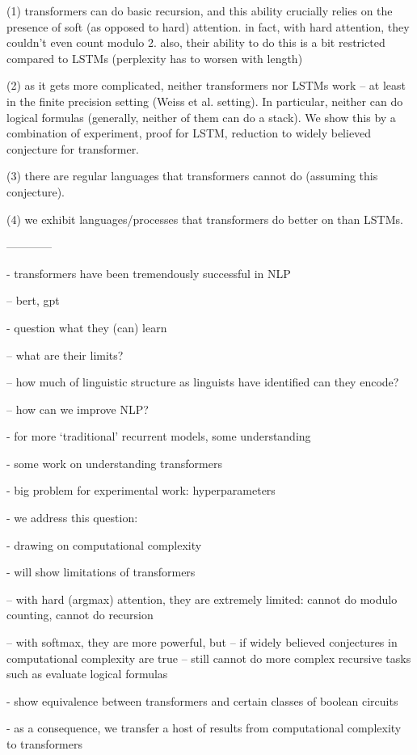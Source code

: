 \documentclass[11pt,a4paper]{article}
\begin{document}
(1) transformers can do basic recursion, and this ability crucially relies on the presence of soft (as opposed to hard) attention. in fact, with hard attention, they couldn't even count modulo 2. also, their ability to do this is a bit restricted compared to LSTMs (perplexity has to worsen with length)

(2) as it gets more complicated, neither transformers nor LSTMs work -- at least in the finite precision setting (Weiss et al. setting).
In particular, neither can do logical formulas (generally, neither of them can do a stack).
We show this by a combination of experiment, proof for LSTM, reduction to widely believed conjecture for transformer.

(3) there are regular languages that transformers cannot do (assuming this conjecture).

(4) we exhibit languages/processes that transformers do better on than LSTMs.



------------

- transformers have been tremendously successful in NLP

-- bert, gpt

- question what they (can) learn 

-- what are their limits?

-- how much of linguistic structure as linguists have identified can they encode?

-- how can we improve NLP?

- for more `traditional' recurrent models, some understanding

- some work on understanding transformers

- big problem for experimental work: hyperparameters

- we address this question:

- drawing on computational complexity

- will show limitations of transformers

-- with hard (argmax) attention, they are extremely limited: cannot do modulo counting, cannot do recursion

-- with softmax, they are more powerful, but -- if widely believed conjectures in computational complexity are true -- still cannot do more complex recursive tasks such as evaluate logical formulas

- show equivalence between transformers and certain classes of boolean circuits

- as a consequence, we transfer a host of results from computational complexity to transformers
\end{document}
